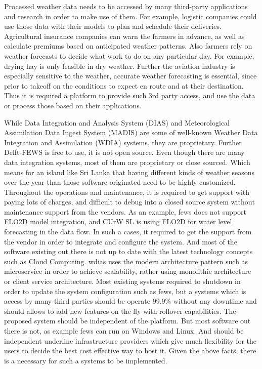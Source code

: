 Processed weather data needs to be accessed by many third-party applications and research in order to make use of them. For example, logistic companies could use those data with their models to plan and schedule their deliveries. Agricultural insurance companies can warn the farmers in advance, as well as calculate premiums based on anticipated weather patterns. Also farmers rely on weather forecasts to decide what work to do on any particular day. For example, drying hay is only feasible in dry weather. Further the aviation industry is especially sensitive to the weather, accurate weather forecasting is essential, since prior to takeoff on the conditions to expect en route and at their destination. 
Thus it is required a platform to provide such 3rd party access, and use the data or process those based on their applications.

While Data Integration and Analysis System (DIAS) and Meteorological Assimilation Data Ingest System (MADIS) are some of well-known Weather Data Integration and Assimilation (WDIA) systems, they are proprietary. Further Delft-FEWS is free to use, it is not open source.
Even though there are many data integration systems, most of them are proprietary or close sourced. Which means for an island like Sri Lanka that having different kinds of weather seasons over the year than those software originated need to be highly customized. Throughout the operations and maintenance, it is required to get support with paying lots of charges, and difficult to debug into a closed source system without maintenance support from the vendors. As an example, \acrshort{fews} does not support FLO2D model integration, and CUrW SL is using FLO2D for water level forecasting in the data flow. In such a cases, it required to get the support from the vendor in order to integrate and configure the system.
And most of the software existing out there is not up to date with the latest technology concepts such as Cloud Computing. \acrfull{wdias} uses the modern architecture pattern such as microservice in order to achieve scalability, rather using monolithic architecture or client service architecture. Most existing systems required to shutdown in order to update the system configuration such as \acrshort{fews}, but a systems which is access by many third parties should be operate 99.9\% without any downtime and should allows to add new features on the fly with rollover capabilities. The proposed system should be independent of the platform. But most software out there is not, as example \acrshort{fews} can run on Windows and Linux. And should be independent underline infrastructure providers which give much flexibility for the users to decide the best cost effective way to host it. Given the above facts, there is a necessary for such a systems to be implemented.

